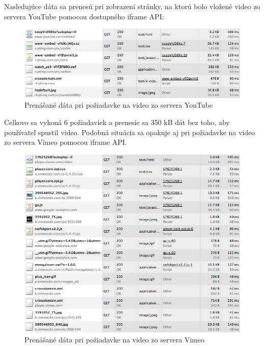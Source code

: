 Nasledujúce dáta sa prenesú pri zobrazení stránky, na ktorú bolo vložené video zo servera YouTube pomocou dostupného iframe API:

\begin{figure}[H]
	\centering
	\includegraphics[width=1.0\textwidth]{img/youtube.png}
	\caption[Prenášané dáta pri požiadavke na video zo servera YouTube]{
		Prenášané dáta pri požiadavke na video zo servera YouTube}
	\label{fig: youtube}
\end{figure}

Celkovo sa vykoná 6 požiadaviek a prenesie sa 350 kB dát bez toho, aby používateľ spustil video. Podobná situácia sa opakuje aj pri požiadavke na video zo servera Vimeo pomocou iframe API.

\newpage
\begin{figure}[H]
	\centering
	\includegraphics[width=1.0\textwidth]{img/vimeo.png}
	\caption[Prenášané dáta pri požiadavke na video zo servera Vimeo]{
		Prenášané dáta pri požiadavke na video zo servera Vimeo}
	\label{fig: vimeo}
\end{figure}

